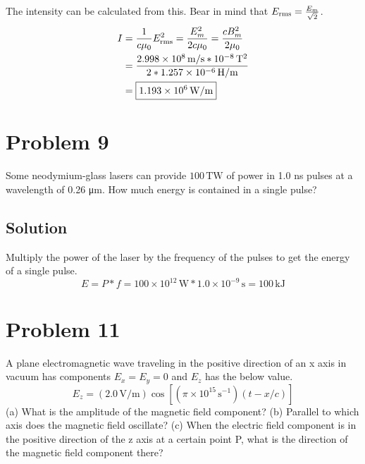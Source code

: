 \documentclass[12pt]{article}
\newcommand{\E}[1]{\times 10^{#1}}
\begin{document}
            The intensity can be calculated from this.
            Bear in mind that $E_{\rm rms} = \frac{E_m}{\sqrt{2}}$.
            \begin{align}
                I   &=  \frac{1}{c \mu_0} E_{\rm rms}^2
                    =   \frac{E_m^2}{2c \mu_0}
                    =   \frac{c B_m^2}{2\mu_0}\\
                    &=  \frac{2.998\E{8}\,\unit{\meter/\second} * 10^{-8}\,\unit{\tesla^2}}{2*1.257\E{-6}\,\unit{\henry/\meter}}\\
                    &=  \boxed{1.193\E{6}\,\unit{\watt/\meter}}
            \end{align}

    \section{Problem 9}
        Some neodymium-glass lasers can provide $100\,\unit{\tera\watt}$ of power in 1.0 ns pulses at a wavelength of 0.26 \unit{\micro\meter}. 
        How much energy is contained in a single pulse?

        \subsection{Solution}
            Multiply the power of the laser by the frequency of the pulses to get the energy of a single pulse.
            \begin{equation}
                E   =   P * f
                    =   100\E{12}\,\unit{\watt} * 1.0\E{-9}\,\unit{\second}
                    =   \boxed{100\,\unit{\kilo\joule}}
            \end{equation}

    \pagebreak
    \section{Problem 11}
        A plane electromagnetic wave traveling in the positive direction of an x axis in vacuum has components $E_x = E_y = 0$ and $E_z$ has the below value. 
        \begin{equation}
            E_z = (2.0\,\unit{\volt/\meter})\cos\left[ (\pi \E{15}\,\unit{\second^{-1}})(t - x/c) \right] 
        \end{equation}
        (a) What is the amplitude of the magnetic field component? 
        (b) Parallel to which axis does the magnetic field oscillate? 
        (c) When the electric field component is in the positive direction of the z axis at a certain point P, what is the direction of the magnetic field component there?
\end{document}
